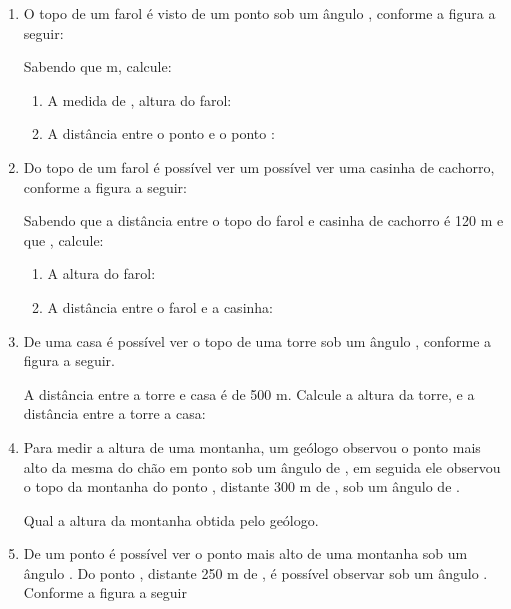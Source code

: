 \documentclass[twocolumn,oneside,a4paper,12pt]{article}
\begin{document}
\pagestyle{empty}
\begin{enumerate}
\item O topo de um farol  é visto de um ponto  sob um ângulo , conforme a figura a seguir:


Sabendo que  m, calcule:
\begin{enumerate}
\item A medida de , altura do farol:
\item A distância entre o ponto  e o ponto :
\end{enumerate}

\item Do topo de um farol é possível ver um possível ver uma casinha de cachorro, conforme a figura a seguir:


Sabendo que a distância entre o topo do farol e casinha de cachorro é 120 m e que , calcule:
\begin{enumerate}
\item A altura do farol:
\item A distância entre o farol e a casinha:
\end{enumerate}

\item De uma casa é possível ver o topo de uma torre sob um ângulo , conforme a figura a seguir.


A distância entre a torre e casa é de 500 m. Calcule a altura da torre, e a distância entre a torre a casa:

\item Para medir a altura de uma montanha, um geólogo observou o ponto mais alto da mesma  do chão em ponto  sob um ângulo de , em seguida ele observou o topo da montanha do ponto , distante 300 m de , sob um ângulo de .


Qual a altura da montanha obtida pelo geólogo.

\item De um ponto  é possível ver o ponto mais alto  de uma montanha sob um ângulo \m{\alpha}. Do ponto , distante 250 m de , é possível observar  sob um ângulo \m{\beta}. Conforme a figura a seguir



\end{enumerate}
\end{document}
